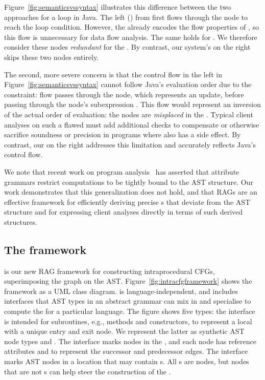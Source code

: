 Figure~\ref{fig:semanticsvssyntax} illustrates this difference between the two approaches for a  loop in Java.
The left (\ParentFirst) {\CFG} from {\jastaddjintraflow} first flows through the  node to reach the loop condition.
However, the {\CFG} already encodes the flow properties of , so this flow is unnecessary for data flow analysis.
The same holds for .
We therefore consider these nodes \emph{redundant} for the {\CFG}.
By contrast, our system's {\ASTUnrestricted} {\CFG} on the right skips these two nodes entirely.


The second, more severe concern is that the control flow
in the left {\CFG} in Figure~\ref{fig:semanticsvssyntax} cannot follow Java's evaluation order due to the {\ParentFirst} constraint:
flow passes through the  node, which represents an update, before passing through the node's subexpression .
This flow would represent an inversion of the actual order of evaluation: the nodes are \emph{misplaced} in the {\CFG}.
Typical client analyses on such a flawed {\CFG} must add additional checks to compensate or otherwise sacrifice soundness or precision in programs where  also has a side effect.
By contrast, our {\ASTUnrestricted} {\CFG} on the right addresses this limitation and accurately reflects Java's control flow.

We note that recent work on program analysis~\cite{szaboincrementalizing,helm2020modular} has asserted that attribute grammars restrict computations to be tightly bound to the AST structure.
Our work demonstrates that this generalization does not hold, and that RAGs are an effective framework for efficiently deriving precise {\CFG}s that deviate from the AST structure and for expressing client analyses directly in terms of such derived structures.


\subsection{The {\intracfg} framework}
{\intracfg} is our new RAG framework for constructing intraprocedural {\ASTUnrestricted} CFGs, superimposing the graph on the AST.
Figure~\ref{fig:intracfgframework} shows the framework as a UML class diagram.
{\intracfg} is language-independent, and includes interfaces that AST types in an abstract grammar can mix in and specialise to compute the {\CFG} for a particular language.
The figure shows five types:
the  interface is intended for subroutines, e.g., methods and constructors, to represent a local {\CFG} with a unique entry and exit node.
  We represent the latter as synthetic AST node types  and .
The  interface marks nodes in the {\CFG}, and each node has reference attributes  and  to represent the successor and predecessor edges.
The  interface marks AST nodes in a location that may contain s.
All s are  nodes, but  nodes that are not s can help steer the construction of the {\CFG}.

